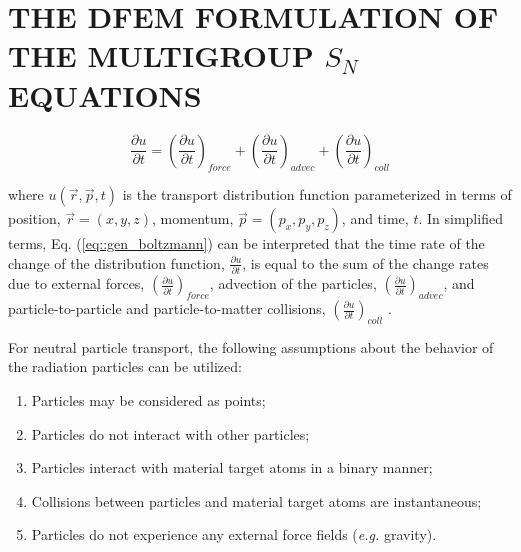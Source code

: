%
%
%
\chapter{\uppercase {The DFEM Formulation of the Multigroup $S_N$ Equations}}



\begin{equation}
\label{eq::gen_boltzmann}
\frac{\partial u}{\partial t} = \left( \frac{\partial u}{\partial t}  \right)_{force} + \left( \frac{\partial u}{\partial t}  \right)_{advec} + \left( \frac{\partial u}{\partial t}  \right)_{coll}
\end{equation}

\noindent where $u(\vec{r},\vec{p},t)$ is the transport distribution function parameterized in terms of position, $\vec{r}=(x,y,z)$, momentum, $\vec{p}=(p_x,p_y,p_z)$, and time, $t$. In simplified terms, Eq. (\ref{eq::gen_boltzmann}) can be interpreted that the time rate of the change of the distribution function, $\frac{\partial u}{\partial t}$, is equal to the sum of the change rates due to external forces, $\left( \frac{\partial u}{\partial t}  \right)_{force} $, advection of the particles, $\left( \frac{\partial u}{\partial t}  \right)_{advec}$, and particle-to-particle and particle-to-matter collisions, $\left( \frac{\partial u}{\partial t}  \right)_{coll}$ \cite{mcgraw_physics}. 

For neutral particle transport, the following assumptions \cite{duderstadt1979transport} about the behavior of the radiation particles can be utilized:

\begin{enumerate}
	\item Particles may be considered as points;
	\item Particles do not interact with other particles;
	\item Particles interact with material target atoms in a binary manner;
	\item Collisions between particles and material target atoms are instantaneous;
	\item Particles do not experience any external force fields ({\em e.g.} gravity).
\end{enumerate}

